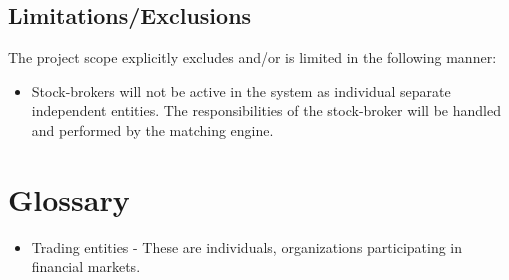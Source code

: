 \documentclass[12pt]{article}
\begin{document}
		\subsection{Limitations/Exclusions}
		The project scope explicitly excludes and/or is limited in the following manner:
		\begin{itemize}
		\item Stock-brokers will not be active in the system as individual separate independent entities. The responsibilities of the stock-broker will be handled and performed by the matching engine.
		\end{itemize}
	
		
	\newpage				    
	\section{Glossary}
	\begin{itemize}
	\item Trading entities - These are individuals, organizations participating in financial markets.
	\end{itemize}					    			    			    		
\end{document}
